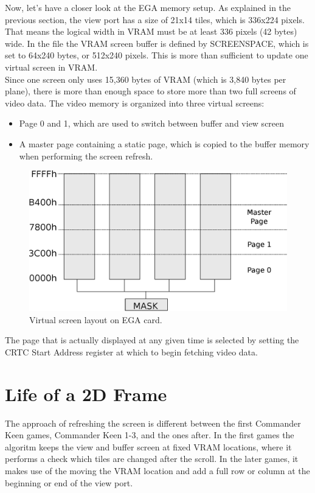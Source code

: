 \documentclass[book.tex]{subfiles}
\begin{document}
Now, let's have a closer look at the EGA memory setup. As explained in the previous section, the view port has a size of 21x14 tiles, which is 336x224 pixels. That means the logical width in VRAM must be at least 336 pixels (42 bytes) wide. In the file  the VRAM screen buffer is defined by SCREENSPACE, which is set to 64x240 bytes, or 512x240 pixels. This is more than sufficient to update one virtual screen in VRAM.\\

Since one screen only uses 15,360 bytes of VRAM (which is 3,840 bytes per plane), there is more than enough space to store more than two full screens of video data. The video memory is organized into three virtual screens:
\begin{itemize}
\item Page 0 and 1, which are used to switch between buffer and view screen
\item A master page containing a static page, which is copied to the buffer memory when performing the screen refresh.
\end{itemize}
\par

\begin{figure}[H]
\centering
\includegraphics[width=\textwidth]{imgs/drawings/ega_ram_architecture.eps}
\caption{Virtual screen layout on EGA card.}
\label{fig:ega_ram_arch}
\end{figure}

The page that is actually displayed at any given time is selected by setting the CRTC Start Address register at which to begin fetching video data.\\




\section{Life of a 2D Frame}
The approach of refreshing the screen is different between the first Commander Keen games, Commander Keen 1-3, and the ones after. In the first games the algoritm keeps the view and buffer screen at fixed VRAM locations, where it performs a check which tiles are changed after the scroll. In the later games, it makes use of the moving the VRAM location and add a full row or column at the beginning or end of the view port. 
\\
\end{document}
